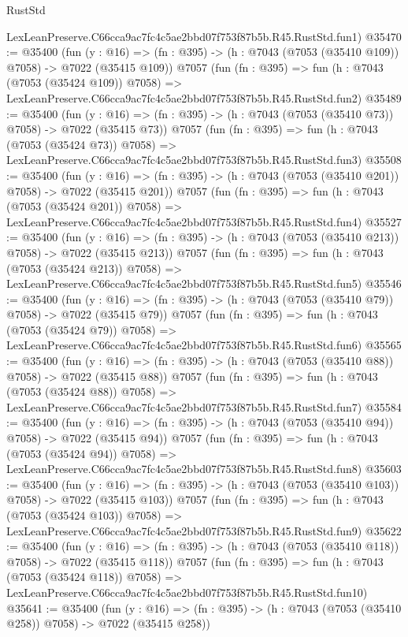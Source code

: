 \begin{lexlean}{RustStd}
\begin{coremodule}
    LexLeanPreserve.C66cca9ac7fc4c5ae2bbd07f753f87b5b.R45.RustStd.fun1)
@35470 := @35400
    (fun (y : @16) => (fn : @395) -> (h : @7043 (@7053 (@35410 @109)) @7058) -> @7022 (@35415 @109))
    @7057
    (fun (fn : @395) =>
    fun (h : @7043 (@7053 (@35424 @109)) @7058) =>
    LexLeanPreserve.C66cca9ac7fc4c5ae2bbd07f753f87b5b.R45.RustStd.fun2)
@35489 := @35400
    (fun (y : @16) => (fn : @395) -> (h : @7043 (@7053 (@35410 @73)) @7058) -> @7022 (@35415 @73))
    @7057
    (fun (fn : @395) =>
    fun (h : @7043 (@7053 (@35424 @73)) @7058) =>
    LexLeanPreserve.C66cca9ac7fc4c5ae2bbd07f753f87b5b.R45.RustStd.fun3)
@35508 := @35400
    (fun (y : @16) => (fn : @395) -> (h : @7043 (@7053 (@35410 @201)) @7058) -> @7022 (@35415 @201))
    @7057
    (fun (fn : @395) =>
    fun (h : @7043 (@7053 (@35424 @201)) @7058) =>
    LexLeanPreserve.C66cca9ac7fc4c5ae2bbd07f753f87b5b.R45.RustStd.fun4)
@35527 := @35400
    (fun (y : @16) => (fn : @395) -> (h : @7043 (@7053 (@35410 @213)) @7058) -> @7022 (@35415 @213))
    @7057
    (fun (fn : @395) =>
    fun (h : @7043 (@7053 (@35424 @213)) @7058) =>
    LexLeanPreserve.C66cca9ac7fc4c5ae2bbd07f753f87b5b.R45.RustStd.fun5)
@35546 := @35400
    (fun (y : @16) => (fn : @395) -> (h : @7043 (@7053 (@35410 @79)) @7058) -> @7022 (@35415 @79))
    @7057
    (fun (fn : @395) =>
    fun (h : @7043 (@7053 (@35424 @79)) @7058) =>
    LexLeanPreserve.C66cca9ac7fc4c5ae2bbd07f753f87b5b.R45.RustStd.fun6)
@35565 := @35400
    (fun (y : @16) => (fn : @395) -> (h : @7043 (@7053 (@35410 @88)) @7058) -> @7022 (@35415 @88))
    @7057
    (fun (fn : @395) =>
    fun (h : @7043 (@7053 (@35424 @88)) @7058) =>
    LexLeanPreserve.C66cca9ac7fc4c5ae2bbd07f753f87b5b.R45.RustStd.fun7)
@35584 := @35400
    (fun (y : @16) => (fn : @395) -> (h : @7043 (@7053 (@35410 @94)) @7058) -> @7022 (@35415 @94))
    @7057
    (fun (fn : @395) =>
    fun (h : @7043 (@7053 (@35424 @94)) @7058) =>
    LexLeanPreserve.C66cca9ac7fc4c5ae2bbd07f753f87b5b.R45.RustStd.fun8)
@35603 := @35400
    (fun (y : @16) => (fn : @395) -> (h : @7043 (@7053 (@35410 @103)) @7058) -> @7022 (@35415 @103))
    @7057
    (fun (fn : @395) =>
    fun (h : @7043 (@7053 (@35424 @103)) @7058) =>
    LexLeanPreserve.C66cca9ac7fc4c5ae2bbd07f753f87b5b.R45.RustStd.fun9)
@35622 := @35400
    (fun (y : @16) => (fn : @395) -> (h : @7043 (@7053 (@35410 @118)) @7058) -> @7022 (@35415 @118))
    @7057
    (fun (fn : @395) =>
    fun (h : @7043 (@7053 (@35424 @118)) @7058) =>
    LexLeanPreserve.C66cca9ac7fc4c5ae2bbd07f753f87b5b.R45.RustStd.fun10)
@35641 := @35400
    (fun (y : @16) => (fn : @395) -> (h : @7043 (@7053 (@35410 @258)) @7058) -> @7022 (@35415 @258))

\end{coremodule}
\end{lexlean}
